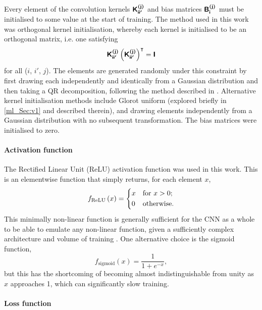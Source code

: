 Every element of the convolution kernels $\bm{\mathsf{K^{(j)}_{ii'}}}$ and bias matrices $\bm{\mathsf{B^{(j)}_i}}$ must be initialised to some value at the start of training. The method used in this work was orthogonal kernel initialisation, whereby each kernel is initialised to be an orthogonal matrix, i.e. one satisfying
\begin{equation}
\bm{\mathsf{K^{(j)}_{i i'}}}
\left( \bm{\mathsf{K^{(j)}_{i i'}}} \right)^\intercal
= \bm{\mathsf{I}}
\end{equation}
for all ($i$, $i'$, $j$). The elements are generated randomly under this constraint by first drawing each independently and identically from a Gaussian distribution and then taking a QR decomposition, following the method described in \citet{Saxe2013}. Alternative kernel initialisation methods include Glorot uniform (explored briefly in \autoref{ml_Sec:v1} and described therein), and drawing elements independently from a Gaussian distribution with no subsequent transformation. The bias matrices were initialised to zero.

\paragraph{Activation function}

The Rectified Linear Unit (ReLU) activation function was used in this work. This is an elementwise function that simply returns, for each element $x$,
\begin{equation}
f_\text{ReLU} \left( x \right) = \begin{dcases}
x & \text{for $x > 0$;} \\
0 & \text{otherwise.}
\end{dcases}
\end{equation}
This minimally non-linear function is generally sufficient for the CNN as a whole to be able to emulate any non-linear function, given a sufficiently complex architecture and volume of training \citep[e.g.][]{Daubechies2019}. One alternative choice is the sigmoid function,
\begin{equation}
f_\text{sigmoid} \left( x \right) = \frac{1}{1 + e^{-x}},
\end{equation}
but this has the shortcoming of becoming almost indistinguishable from unity as $x$ approaches 1, which can significantly slow training.

\paragraph{Loss function}


